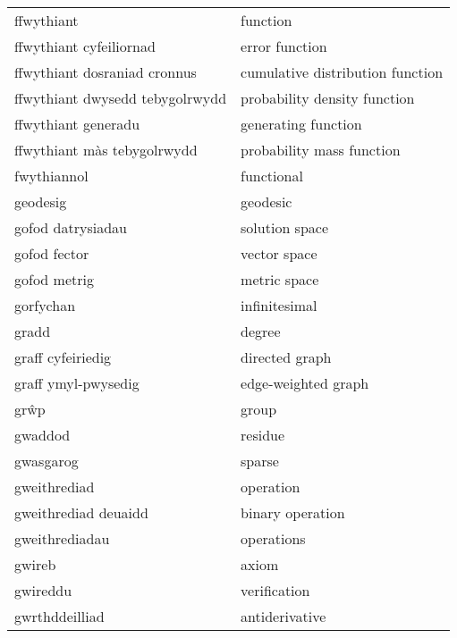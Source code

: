 \begin{supertabular}{p{0.22\textwidth}p{0.22\textwidth}}
                     ffwythiant &                         function \\
        ffwythiant cyfeiliornad &                   error function \\
   ffwythiant dosraniad cronnus & cumulative distribution function \\
ffwythiant dwysedd tebygolrwydd &     probability density function \\
            ffwythiant generadu &              generating function \\
    ffwythiant màs tebygolrwydd &        probability mass function \\
                    fwythiannol &                       functional \\
                       geodesig &                         geodesic \\
              gofod datrysiadau &                   solution space \\
                   gofod fector &                     vector space \\
                   gofod metrig &                     metric space \\
                      gorfychan &                    infinitesimal \\
                          gradd &                           degree \\
              graff cyfeiriedig &                   directed graph \\
            graff ymyl-pwysedig &              edge-weighted graph \\
                           grŵp &                            group \\
                        gwaddod &                          residue \\
                      gwasgarog &                           sparse \\
                   gweithrediad &                        operation \\
           gweithrediad deuaidd &                 binary operation \\
                 gweithrediadau &                       operations \\
                         gwireb &                            axiom \\
                       gwireddu &                     verification \\
                 gwrthddeilliad &                   antiderivative \\

\end{supertabular}
